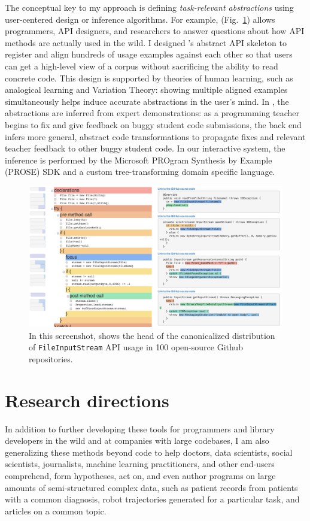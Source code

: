 \documentclass[justified]{tufte-handout}
\begin{document}
The conceptual key to my approach is defining \emph{task-relevant abstractions} using user-centered design or inference algorithms. For example,  (Fig.~\ref{fig:examplore}) allows programmers, API designers, and researchers to answer questions about how API methods are actually used in the wild.\cite{examplore} I designed 's abstract API skeleton to register and align hundreds of usage examples against each other so that users can get a high-level view of a corpus without sacrificing the ability to read concrete code. This design is supported by theories of human learning, such as analogical learning and Variation Theory: showing multiple aligned examples simultaneously helps induce accurate abstractions in the user's mind. In , the abstractions are inferred from expert demonstrations: as a programming teacher begins to fix and give feedback on buggy student code submissions, the back end infers more general, abstract code transformations to propagate fixes and relevant teacher feedback to other buggy student code.\cite{lats17} In our interactive system, the inference is performed by the Microsoft PROgram Synthesis by Example (PROSE) SDK and a custom tree-transforming domain specific language.
\begin{figure}[h]
  \includegraphics[width=0.64\linewidth]{Statistical_Code_Examples.png}
  \caption{In this screenshot,  shows the head of the canonicalized distribution of \texttt{FileInputStream} API usage in 100 open-source Github repositories.}%
  \label{fig:examplore}%
\end{figure}

\section{Research directions}

In addition to further developing these tools for programmers and library developers in the wild and at companies with large codebases, I am also generalizing these methods beyond code to help doctors, data scientists, social scientists, journalists, machine learning practitioners, and other end-users comprehend, form hypotheses, act on, and even author programs on large amounts of semi-structured complex data, such as patient records from patients with a common diagnosis, robot trajectories generated for a particular task, and articles on a common topic.
\end{document}
